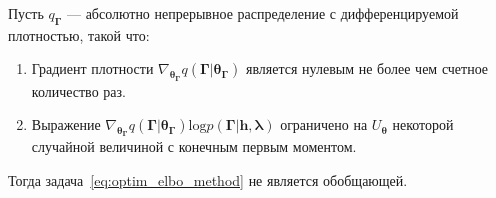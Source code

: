 \begin{theorem}
Пусть $q_{\boldsymbol{\Gamma}}$ --- абсолютно непрерывное распределение с дифференцируемой плотностью, такой что:
\begin{enumerate}
\item Градиент плотности $\nabla_{\boldsymbol{\theta}_{\boldsymbol{\Gamma}}} q(\boldsymbol{\Gamma}|\boldsymbol{\theta}_{\boldsymbol{\Gamma}})$ является нулевым не более чем счетное количество раз. 
\item Выражение $\nabla_{\boldsymbol{\theta}_{\boldsymbol{\Gamma}}} q(\boldsymbol{\Gamma}|\boldsymbol{\theta}_{\boldsymbol{\Gamma}}) \text{log}p(\boldsymbol{\Gamma}|\mathbf{h}, \boldsymbol{\lambda})$ ограничено на $U_{\boldsymbol{\theta}}$ некоторой случайной величиной с конечным первым моментом.
\end{enumerate}
Тогда задача~\eqref{eq:optim_elbo_method} не является обобщающей.
\end{theorem}
